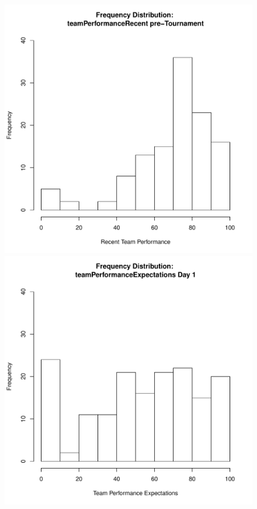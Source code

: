 \documentclass[12pt]{report}
\begin{document}
{%
\begin{figure}[htbp]
  \includegraphics[scale =.4]{../images/distTeamPerformancePre.pdf}
  \includegraphics[scale =.4]{../images/distTeamPerfExpDay1.pdf}

\end{figure}}
\end{document}
